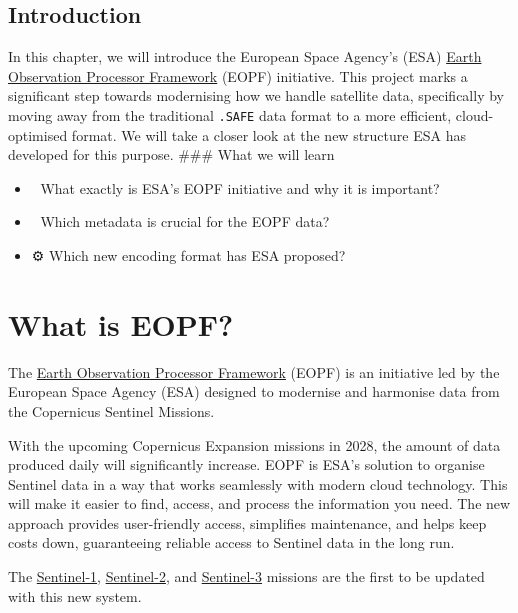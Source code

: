 \documentclass[
  letterpaper,
  DIV=11,
  numbers=noendperiod]{scrreprt}
\providecommand{\tightlist}{%
  \setlength{\itemsep}{0pt}\setlength{\parskip}{0pt}}
\begin{document}
\subsection{Introduction}\label{introduction}

In this chapter, we will introduce the European Space Agency's (ESA)
\href{https://eopf.copernicus.eu/}{Earth Observation Processor
Framework} (EOPF) initiative. This project marks a significant step
towards modernising how we handle satellite data, specifically by moving
away from the traditional \texttt{.SAFE} data format to a more
efficient, cloud-optimised format. We will take a closer look at the new
structure ESA has developed for this purpose. \#\#\# What we will learn

\begin{itemize}
\tightlist
\item
  📡 What exactly is ESA's EOPF initiative and why it is important?
\item
  📀 Which metadata is crucial for the EOPF data?
\item
  ⚙️ Which new encoding format has ESA proposed?
\end{itemize}

\section{What is EOPF?}\label{what-is-eopf}

The \href{https://eopf.copernicus.eu/}{Earth Observation Processor
Framework} (EOPF) is an initiative led by the European Space Agency
(ESA) designed to modernise and harmonise data from the Copernicus
Sentinel Missions.

With the upcoming Copernicus Expansion missions in 2028, the amount of
data produced daily will significantly increase. EOPF is ESA's solution
to organise Sentinel data in a way that works seamlessly with modern
cloud technology. This will make it easier to find, access, and process
the information you need. The new approach provides user-friendly
access, simplifies maintenance, and helps keep costs down, guaranteeing
reliable access to Sentinel data in the long run.

The
\href{https://www.esa.int/Applications/Observing_the_Earth/Copernicus/Sentinel-1}{Sentinel-1},
\href{https://www.esa.int/Applications/Observing_the_Earth/Copernicus/Sentinel-2}{Sentinel-2},
and
\href{https://www.esa.int/Applications/Observing_the_Earth/Copernicus/Sentinel-3}{Sentinel-3}
missions are the first to be updated with this new system.
\end{document}
